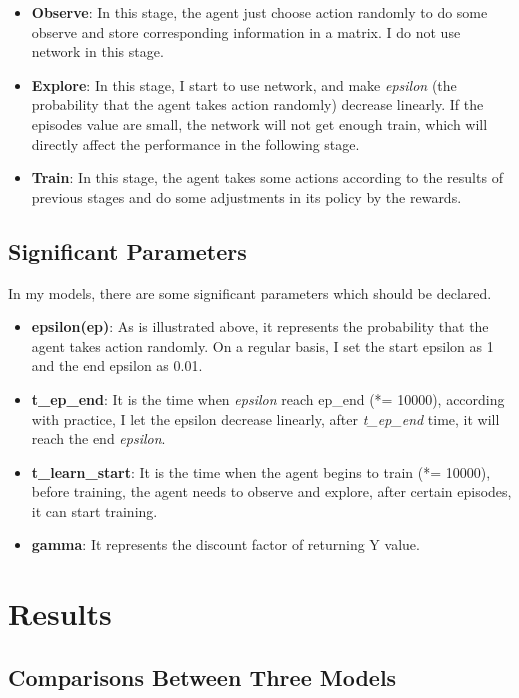 \documentclass[10pt,twocolumn,letterpaper]{article}
\begin{document}
		\begin{itemize}
			\item \textbf{Observe}: In this stage, the agent just choose action randomly to do some observe and store corresponding information in a matrix. I do not use network in this stage.
			\item \textbf{Explore}: In this stage, I start to use network, and make \textit{epsilon} (the probability that the agent takes action randomly) decrease linearly. If the episodes value are small, the network will not get enough train, which will directly affect the performance in the following stage.
			\item \textbf{Train}: In this stage, the agent takes some actions according to the results of previous stages and do some adjustments in its policy by the rewards.
		\end{itemize}
	
	\subsection{Significant Parameters}
		In my models, there are some significant parameters which should be declared.
	
		\begin{itemize}
			\item \textbf{epsilon(ep)}: As is illustrated above, it represents the probability that the agent takes action randomly. On a regular basis, I set the start epsilon as 1 and the end epsilon as 0.01.
			\item \textbf{t\_ep\_end}: It is the time when \textit{epsilon} reach ep\_end (*= 10000), according with practice, I let the epsilon decrease linearly, after \textit{t\_ep\_end} time, it will reach the end \textit{epsilon}.
			\item \textbf{t\_learn\_start}: It is the time when the agent begins to train (*= 10000), before training, the agent needs to observe and explore, after certain episodes, it can start training.
			\item \textbf{gamma}: It represents the discount factor of returning Y value.
		\end{itemize}
	
\section{Results}
\subsection{Comparisons Between Three Models}
\end{document}
